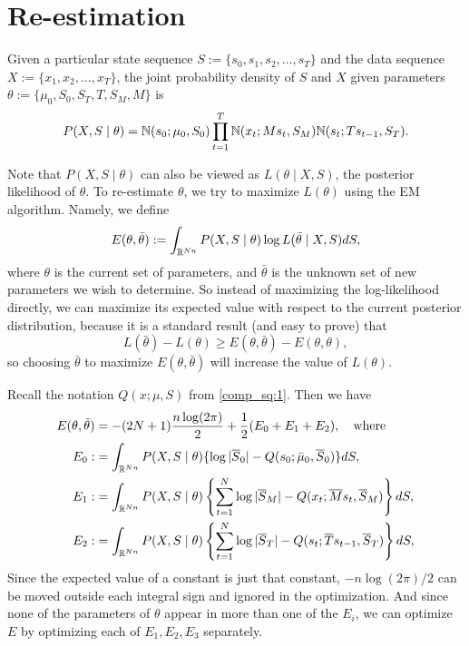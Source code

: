 \documentclass[12pt,leqno]{article}
\begin{document}
\section{Re-estimation}
Given a particular state sequence $S := \{s_0,s_1,s_2,\dots,s_T\}$ and the data sequence $X := \{x_1,x_2,\dots,x_T\}$,
the joint probability density of $S$ and $X$ given parameters $\theta := \{\mu_0,S_0,S_T,T,S_M,M\}$ is
$$
P(X,S\mid\theta) = {\mathbb N}(s_0;\mu_0,S_0)\prod_{t=1}^T{\mathbb N}(x_t;Ms_t,S_M){\mathbb N}(s_t;Ts_{t-1},S_T).
$$

Note that $P(X,S\mid\theta)$ can also be viewed as  $L(\theta\mid X,S)$, the posterior likelihood of $\theta$.
To re-estimate $\theta$, we try to maximize $L(\theta)$ using the EM algorithm. Namely, we define 
$$
E(\theta,\bar{\theta}) := \int_{{\mathbb R}^{Nn}}P(X,S\mid\theta)\log{L(\bar{\theta}\mid X,S)}dS,
$$
where $\theta$ is the current set of parameters, and $\bar{\theta}$ is the unknown set of new parameters
we wish to determine. So instead of maximizing the log-likelihood directly, we can maximize its expected
value with respect to the current posterior distribution, because it is a standard result \cite{Dempster}
(and easy to prove) that
$$
L(\bar{\theta}) - L(\theta) \ge E(\theta,\bar{\theta}) - E(\theta,\theta),
$$
so choosing $\bar{\theta}$ to maximize $E(\theta,\bar{\theta})$ will increase the value of $L(\theta)$.


  
Recall the notation $Q(x;\mu,S)$ from \eqref{comp_sq:1}.  Then we have
\begin{align}
  E(\theta,\bar{\theta}) &= -(2N+1)\frac{n\log(2\pi)}{2} + \frac{1}{2}(E_0 + E_1 + E_2),\quad\text{where}\notag\\
  E_0 :&=\int_{{\mathbb R}^{Nn}}P(X,S\mid\theta)\{\log|\overline{S}_0| - Q(s_0;\bar{\mu}_0,\overline{S}_0)\}dS,\label{E0}\\
  E_1 :&= \int_{{\mathbb R}^{Nn}}P(X,S\mid\theta)\left\{\sum_{t=1}^N\log|\overline{S}_M| - Q(x_t;\overline{M}s_t,\overline{S}_M)\right\}dS,
\label{E1}\\
E_2 :&= \int_{{\mathbb R}^{Nn}}P(X,S\mid\theta)\left\{\sum_{t=1}^N\log|\overline{S}_T| - Q(s_t;\overline{T}s_{t-1},\overline{S}_T)\right\}dS,
\label{E2}
\end{align}
Since the expected value of a constant is just that constant, $-n\log(2\pi)/2$ can be moved outside each
integral sign and ignored in the optimization.  And since none of the parameters of $\theta$ appear in more
than one of the $E_i$, we can optimize $E$ by optimizing each of $E_1,E_2,E_3$ separately.
\end{document}

